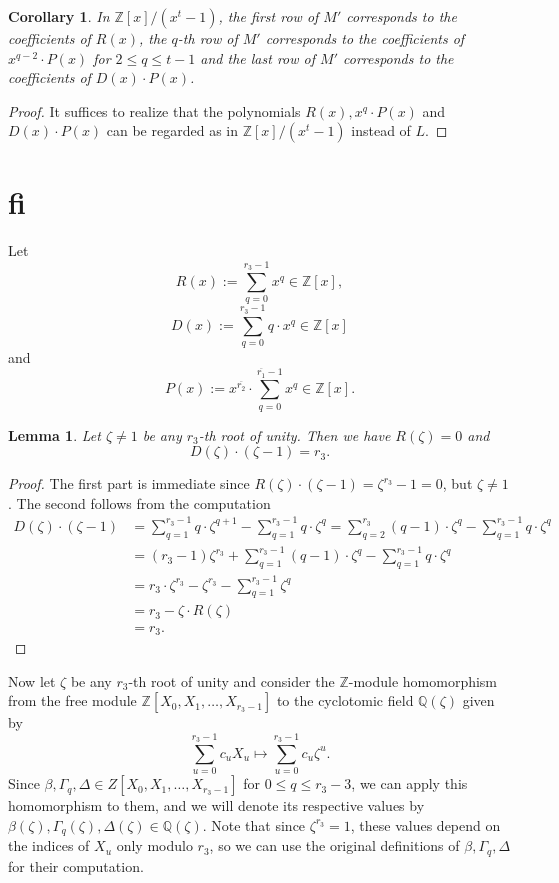 \documentclass[12pt,a4paper]{article}
\newtheorem{lemma}[theorem]{Lemma}
\newtheorem{cor}[theorem]{Corollary}
\theoremstyle{definition}
\newcommand{\Q}{\mathbb{Q}}
\newcommand{\Z}{\mathbb{Z}}
\newcommand{\z}{\zeta}
\newcommand{\uo}{\overline{r_2}}
\newcommand{\vo}{\overline{r_1}}
\begin{document}
\begin{cor}
In $\Z[x]/(x^t-1)$, the first row of $M'$ corresponds to the coefficients of $R(x)$, the $q$-th row of $M'$ corresponds to the coefficients of $x^{q-2}\cdot P(x)$ for $2\leq q\leq t-1$ and the last row of $M'$ corresponds to the coefficients of $D(x)\cdot P(x)$.
\end{cor}
\begin{proof}
It suffices to realize that the polynomials $R(x), x^q\cdot P(x)$ and $D(x)\cdot P(x)$ can be regarded as in $\Z[x]/(x^t-1)$ instead of $L$.
\end{proof}
\section{fi}
\fi

\paragraph*{}
Let $$R(x):=\sum_{q=0}^{r_3-1} x^q\in\Z[x],$$
$$D(x):=\sum_{q=0}^{r_3-1}q\cdot x^q\in \Z[x]$$
and 
$$P(x):=x^{\uo}\cdot \sum_{q=0}^{\vo-1} x^q\in \Z[x].$$

\begin{lemma}
Let $\zeta\neq 1$ be any $r_3$-th root of unity. Then we have $R(\zeta)=0$ and $$D(\zeta)\cdot(\zeta-1)=r_3.$$
\end{lemma}
\begin{proof}
The first part is immediate since $R(\zeta)\cdot(\zeta-1)=\zeta^{r_3}-1=0$, but $\zeta\neq 1$. The second follows from the computation
\begin{equation*}
\begin{split}
D(\zeta)\cdot(\zeta-1)&=\sum_{q=1}^{r_3-1} q\cdot \zeta^{q+1}-\sum_{q=1}^{r_3-1} q\cdot \zeta^q=\sum_{q=2}^{r_3} (q-1)\cdot \zeta^{q}-\sum_{q=1}^{r_3-1} q\cdot \zeta^q\\
&=(r_3-1)\zeta^{r_3}+\sum_{q=1}^{r_3-1} (q-1)\cdot \zeta^{q}-\sum_{q=1}^{r_3-1} q\cdot \zeta^q\\
&=r_3\cdot \zeta^{r_3}-\zeta^{r_3}-\sum_{q=1}^{r_3-1} \zeta^{q}\\
&=r_3-\zeta\cdot R(\zeta)\\
&=r_3.
\end{split}
\end{equation*}
\end{proof}

Now let $\z$ be any $r_3$-th root of unity and consider the $\Z$-module homomorphism from the free module $\Z[X_0,X_1,\dots,X_{r_3-1}]$ to the cyclotomic field $\Q(\z)$ given by $$\sum_{u=0}^{r_3-1}c_u X_u\mapsto \sum_{u=0}^{r_3-1}c_u \z^u.$$ Since $\beta,\Gamma_q,\Delta \in Z[X_0,X_1,\dots,X_{r_3-1}]$ for $0\leq q\leq r_3-3$, we can apply this homomorphism to them, and we will denote its respective values by $\beta(\z),\Gamma_q(\z),\Delta(\z)\in\Q(\z)$. Note that since $\z^{r_3}=1$, these values depend on the indices of $X_u$ only modulo $r_3$, so we can use the original definitions of $\beta,\Gamma_q,\Delta$ for their computation.
\end{document}

